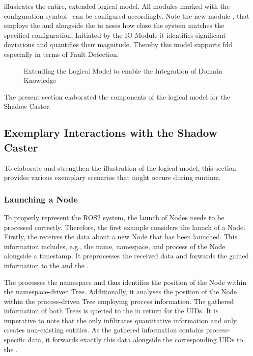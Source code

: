          illustrates the entire, extended logical model. All modules marked with the configuration symbol \config~can be configured accordingly. Note the new module , that employs the  and  alongside the  to asses how close the system matches the specified configuration. Initiated by the IO-Module it identifies significant deviations and quantifies their magnitude. Thereby this model supports \acl{fdd} especially in terms of Fault Detection.
        \begin{figure}[h]
            \centering
            
            \caption{Extending the Logical Model to enable the Integration of Domain Knowledge} \label{fig:tikz:dshadow:logicalModelextended}
        \end{figure}


        The present section elaborated the components of the logical model for the Shadow Caster.

        
        \subsection{Exemplary Interactions with the Shadow Caster} \label{subsec:dshadow:logical:examples}
        To elaborate and strengthen the illustration of the logical model, this section provides various exemplary scenarios that might occure during runtime.

            \subsubsection{Launching a Node}
            To properly represent the ROS2 system, the launch of Nodes needs to be processed correctly. Therefore, the first example considers the launch of a Node.\newline
            Firstly, the  receives the data about a new Node that has been launched. This information includes, e.g., the name, namespace, and process of the Node alongside a timestamp. It preprocesses the received data and forwards the gained information to the  and the .
            
            The  processes the namespace and thus identifies the position of the Node within the namespace-driven Tree. Additionally, it analyses the position of the Node within the process-driven Tree employing process information. The gathered information of both Trees is queried to the  in return for the UIDs. It is imperative to note that the  only infiltrates quantitative information and only creates non-existing entities.\newline
            As the gathered information contains process-specific data, it forwards exactly this data alongside the corresponding UIDs to the .

